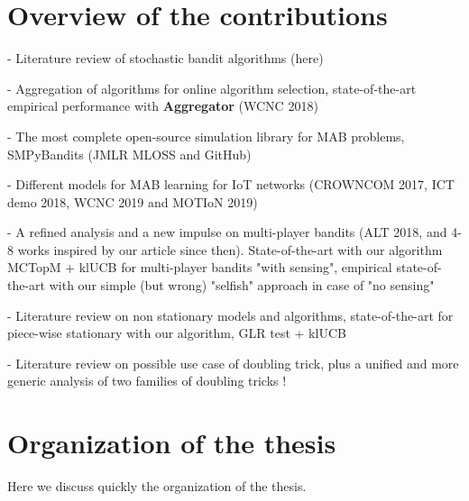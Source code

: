 \section{Overview of the contributions}
\label{sec:1:contributions}

- Literature review of stochastic bandit algorithms (here)

- Aggregation of algorithms for online algorithm selection, state-of-the-art empirical performance with \textbf{Aggregator} (WCNC 2018)

- The most complete open-source simulation library for MAB problems, SMPyBandits (JMLR MLOSS and GitHub)

- Different models for MAB learning for IoT networks (CROWNCOM 2017, ICT demo 2018, WCNC 2019 and MOTIoN 2019)

- A refined analysis and a new impulse on multi-player bandits (ALT 2018, and 4-8 works inspired by our article since then). State-of-the-art with our algorithm MCTopM + klUCB for multi-player bandits "with sensing", empirical state-of-the-art with our simple (but wrong) "selfish" approach in case of "no sensing"

- Literature review on non stationary models and algorithms, state-of-the-art for piece-wise stationary with our algorithm, GLR test + klUCB

- Literature review on possible use case of doubling trick, plus a unified and more generic analysis of two families of doubling tricks !


\section{Organization of the thesis}
\label{sec:1:organization}

Here we discuss quickly the organization of the thesis.

